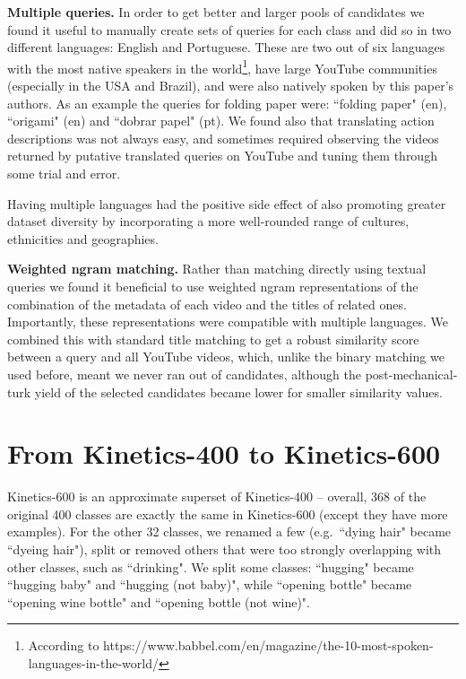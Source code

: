 \documentclass[10pt,twocolumn,letterpaper]{article}
\begin{document}
\vspace{3mm}
\noindent \textbf{Multiple queries.} 
In order to get better and larger pools of candidates we found it
useful to manually create sets of queries for each class and did so in
two different languages: English and Portuguese. These are two out of
six languages with the most native speakers in the
world\footnote{According to
https://www.babbel.com/en/magazine/the-10-most-spoken-languages-in-the-world/},
have large YouTube communities (especially in the USA and Brazil), and
were also natively spoken by this paper's authors.
As an example the queries for folding paper were: ``folding paper"
(en), ``origami" (en) and ``dobrar papel" (pt). We found also that
translating action descriptions was not always easy, and sometimes
required observing the videos returned by putative translated queries
on YouTube and tuning them through some trial and error.

Having multiple languages had the positive side effect of also promoting greater dataset diversity by incorporating a more well-rounded range of cultures, ethnicities and geographies.

\vspace{3mm}
\noindent \textbf{Weighted ngram matching.} Rather than matching directly using textual queries we found it beneficial to use weighted ngram representations of the combination of the metadata of each video and the titles of related ones. Importantly, these representations were compatible with multiple languages. We combined this with standard title matching to get a robust similarity score between a query and all YouTube videos, which, unlike the binary matching we used before, meant we never ran out of candidates, although the post-mechanical-turk yield of the selected candidates became lower for smaller similarity values.

\section{From Kinetics-400 to Kinetics-600}

Kinetics-600 is an approximate superset of Kinetics-400 -- overall,
368 of the original 400 classes are exactly the same in
Kinetics-600 (except they have more examples). For the other 32
classes, we renamed a few (e.g.\ ``dying hair" became ``dyeing hair"),
split or removed others that were too strongly overlapping with other
classes, such as ``drinking". We split some classes: ``hugging" became
``hugging baby" and ``hugging (not baby)", while ``opening bottle" became
``opening wine bottle" and ``opening bottle (not wine)".
\end{document}
